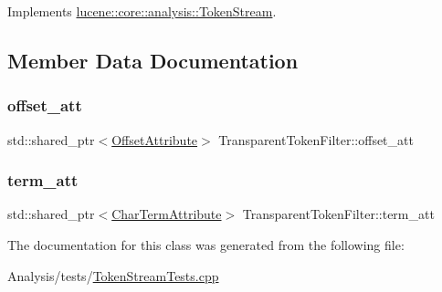 Implements \mbox{\hyperlink{classlucene_1_1core_1_1analysis_1_1TokenStream_a614d4ea24a354d6f4354b4941b5124e2}{lucene\+::core\+::analysis\+::\+Token\+Stream}}.



\subsection{Member Data Documentation}
\mbox{\label{classTransparentTokenFilter_a068937d3502af2266f0bad7c7943252a}} 
\subsubsection{\texorpdfstring{offset\+\_\+att}{offset\_att}}
{\footnotesize\ttfamily std\+::shared\+\_\+ptr$<$\mbox{\hyperlink{classlucene_1_1core_1_1analysis_1_1tokenattributes_1_1OffsetAttribute}{Offset\+Attribute}}$>$ Transparent\+Token\+Filter\+::offset\+\_\+att}

\mbox{\label{classTransparentTokenFilter_abbfe63255f2b10eeb803f10cd9f9b8a3}} 
\subsubsection{\texorpdfstring{term\+\_\+att}{term\_att}}
{\footnotesize\ttfamily std\+::shared\+\_\+ptr$<$\mbox{\hyperlink{classlucene_1_1core_1_1analysis_1_1tokenattributes_1_1CharTermAttribute}{Char\+Term\+Attribute}}$>$ Transparent\+Token\+Filter\+::term\+\_\+att}



The documentation for this class was generated from the following file\+:\begin{DoxyCompactItemize}
\item 
Analysis/tests/\mbox{\hyperlink{TokenStreamTests_8cpp}{Token\+Stream\+Tests.\+cpp}}\end{DoxyCompactItemize}
